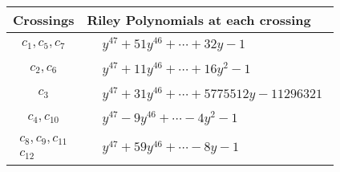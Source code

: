 \documentclass[1p]{elsarticle_modified}
\theoremstyle{definition}
\begin{document}
\begin{tabular}{m{50pt}|m{274pt}}
Crossings & \hspace{64pt}Riley Polynomials at each crossing \\
\hline $$\begin{aligned}c_{1},c_{5},c_{7}\end{aligned}$$&$\begin{aligned}
&y^{47}+51 y^{46}+\cdots+32 y-1
\end{aligned}$\\
\hline $$\begin{aligned}c_{2},c_{6}\end{aligned}$$&$\begin{aligned}
&y^{47}+11 y^{46}+\cdots+16 y^2-1
\end{aligned}$\\
\hline $$\begin{aligned}c_{3}\end{aligned}$$&$\begin{aligned}
&y^{47}+31 y^{46}+\cdots+5775512 y-11296321
\end{aligned}$\\
\hline $$\begin{aligned}c_{4},c_{10}\end{aligned}$$&$\begin{aligned}
&y^{47}-9 y^{46}+\cdots-4 y^2-1
\end{aligned}$\\
\hline $$\begin{aligned}c_{8},c_{9},c_{11}\\c_{12}\end{aligned}$$&$\begin{aligned}
&y^{47}+59 y^{46}+\cdots-8 y-1
\end{aligned}$\\
\hline
\end{tabular}
\vskip 2pc
\end{document}
